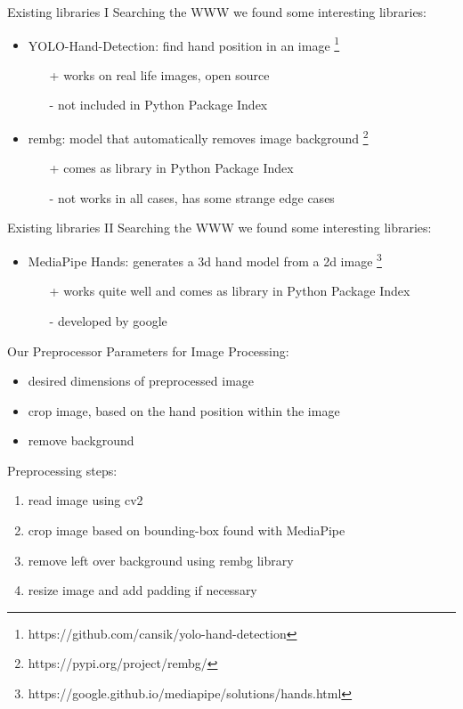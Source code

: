 \documentclass[aspectratio=169]{beamer}
\begin{document}
{	\begin{frame}{Existing libraries I}
	Searching the WWW we found some interesting libraries:
	\begin{itemize}
		\item YOLO-Hand-Detection: find hand position in an image \footnote{https://github.com/cansik/yolo-hand-detection}
		\begin{itemize}
			\item[+] works on real life images, open source
			\item[-] not included in Python Package Index
		\end{itemize}
		\pause
		\item rembg: model that automatically removes image background \footnote{https://pypi.org/project/rembg/}
		\begin{itemize}
			\item[+] comes as library in Python Package Index 
			\item[-] not works in all cases, has some strange edge cases
		\end{itemize}
	\end{itemize}
	\end{frame}
	
	\begin{frame}{Existing libraries II}
	Searching the WWW we found some interesting libraries:
	\begin{itemize}
		\item MediaPipe Hands: generates a 3d hand model from a 2d image \footnote{https://google.github.io/mediapipe/solutions/hands.html} \cite{mediapipe}
		\begin{itemize}
			\item[+] works quite well and comes as library in Python Package Index 
			\item[-] developed by google
		\end{itemize}
	\end{itemize}
	\end{frame}
	
	\begin{frame}{Our Preprocessor}
	Parameters for Image Processing:
	\begin{itemize}
		\item desired dimensions  of preprocessed image
		\item crop image, based on the hand position within the image
		\item remove background
	\end{itemize}
	\pause
	Preprocessing steps:
	\begin{enumerate}
	\item read image using cv2
	\item crop image based on bounding-box found with MediaPipe
	\item remove left over background using rembg library
	\item resize image and add padding if necessary
	\end{enumerate}
	\end{frame}
	
}
\end{document}
